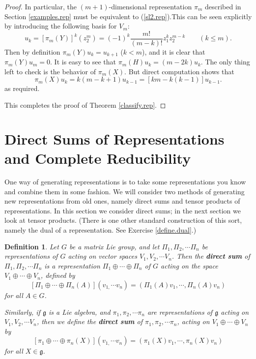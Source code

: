 \documentclass[12pt]{amsbook}
\let \frak = \mathfrak
\theoremstyle{plain}
\newtheorem{definition}[theorem]{Definition}
\numberwithin{equation}{chapter}
\numberwithin{theorem}{chapter}
\begin{document}
\begin{proof}
In particular, the $(m+1)$-dimensional representation $\pi_{m}$ described in
Section \ref{examples.rep} must be equivalent to (\ref{sl2.rep}).This can be
seen explicitly by introducing the following basis for $V_{m}$:
\[
u_{k}=\left[  \pi_{m}(Y)\right]  ^{k}(z_{2}^{m})=(-1)^{k}\frac{m!}%
{(m-k)!}z_{1}^{k}z_{2}^{m-k}\qquad(k\leq m)\text{.}%
\]
Then by definition $\pi_{m}(Y)u_{k}=u_{k+1}$ ($k<m$), and it is clear that
$\pi_{m}(Y)u_{m}=0$. It is easy to see that $\pi_{m}(H)u_{k}=(m-2k)u_{k}$. The
only thing left to check is the behavior of $\pi_{m}(X)$. But direct
computation shows that
\[
\pi_{m}(X)u_{k}=k(m-k+1)u_{k-1}=\left[  km-k(k-1)\right]  u_{k-1}\text{.}%
\]
as required.

This completes the proof of Theorem \ref{classify.rep}.
\end{proof}

\section{Direct Sums of Representations and Complete Reducibility}

One way of generating representations is to take some representations you know
and combine them in some fashion. We will consider two methods of generating
new representations from old ones, namely direct sums and tensor products of
representations. In this section we consider direct sums; in the next section
we look at tensor products. (There is one other standard construction of this
sort, namely the dual of a representation. See Exercise \ref{define.dual}.)

\begin{definition}
Let $G$ be a matrix Lie group, and let $\Pi_{1},\Pi_{2},\cdots\Pi_{n}$ be
representations of $G$ acting on vector spaces $V_{1},V_{2},\cdots V_{n}$.
Then the \textbf{direct sum} of $\Pi_{1},\Pi_{2},\cdots\Pi_{n}$ is a
representation $\Pi_{1}\oplus\cdots\oplus\Pi_{n}$ of $G$ acting on the space
$V_{1}\oplus\cdots\oplus V_{n}$, defined by
\[
\left[  \Pi_{1}\oplus\cdots\oplus\Pi_{n}(A)\right]  \left(  v_{1,}\cdots
v_{n}\right)  =\left(  \Pi_{1}(A)v_{1},\cdots,\Pi_{n}(A)v_{n}\right)
\]
for all $A\in G$.

Similarly, if $\frak{g}$ is a Lie algebra, and $\pi_{1},\pi_{2},\cdots\pi_{n}$
are representations of $\frak{g}$ acting on $V_{1},V_{2},\cdots V_{n}$, then
we define the \textbf{direct sum} of $\pi_{1},\pi_{2},\cdots\pi_{n}$, acting
on $V_{1}\oplus\cdots\oplus V_{n}$ by
\[
\left[  \pi_{1}\oplus\cdots\oplus\pi_{n}(X)\right]  \left(  v_{1,}\cdots
v_{n}\right)  =\left(  \pi_{1}(X)v_{1},\cdots,\pi_{n}(X)v_{n}\right)
\]
for all $X\in\frak{g}$.
\end{definition}
\end{document}
